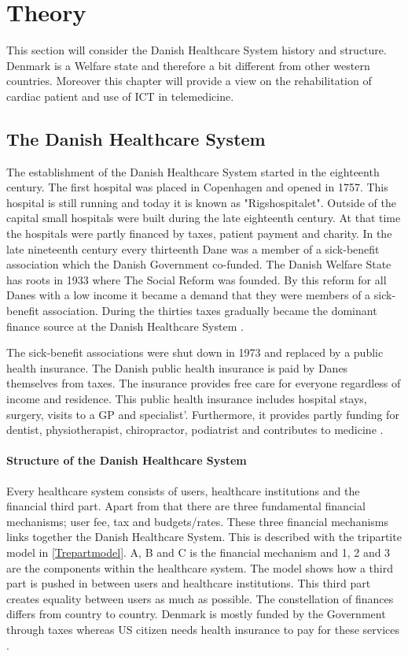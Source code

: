 \chapter{Theory}

This section will consider the Danish Healthcare System history and structure. Denmark is a Welfare state and therefore a bit different from other western countries. Moreover this chapter will provide a view on the rehabilitation of cardiac patient and use of ICT in telemedicine.

\section{The Danish Healthcare System} \label{DHS}


The establishment of the Danish Healthcare System started in the eighteenth century. The first hospital was placed in Copenhagen and opened in 1757. This hospital is still running and today it is known as "Rigshospitalet". Outside of the capital small hospitals were built during the late eighteenth century. At that time the hospitals were partly financed by taxes, patient payment and charity. In the late nineteenth century every thirteenth Dane was a member of a sick-benefit association which the Danish Government co-funded. The Danish Welfare State has roots in 1933 where The Social Reform was founded. By this reform for all Danes with a low income it became a demand that they were members of a sick-benefit association. During the thirties taxes gradually became the dominant finance source at the Danish Healthcare System \cite{sundhedsvaesen}. 

The sick-benefit associations were shut down in 1973 and replaced by a public health insurance. The Danish public health insurance is paid by Danes themselves from taxes. The insurance provides free care for everyone regardless of income and residence. This public health insurance includes hospital stays, surgery, visits to a GP and specialist'. Furthermore, it provides partly funding for dentist, physiotherapist, chiropractor, podiatrist and contributes to medicine \cite{rasmussen2011hjerterehabilitering, Healthcareindk2}.

\subsubsection{Structure of the Danish Healthcare System}
Every healthcare system consists of users, healthcare institutions and the financial third part. Apart from that there are three fundamental financial mechanisms; user fee, tax and budgets/rates. These three financial mechanisms links together the Danish Healthcare System. This is described with the tripartite model in \cref{Trepartmodel}. A, B and C is the financial mechanism and 1, 2 and 3 are the components within the healthcare system. The model shows how a third part is pushed in between users and healthcare institutions. This third part creates equality between users as much as possible. The constellation of finances differs from country to country. Denmark is mostly funded by the Government through taxes whereas US citizen needs health insurance to pay for these services \cite{sundhedsvaesen}. 


